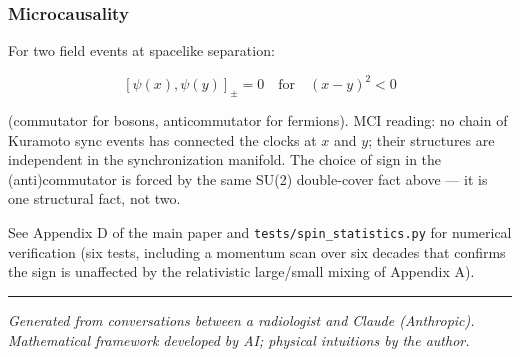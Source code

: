 \documentclass[
]{article}
\begin{document}
\subsubsection{Microcausality}\label{microcausality}

For two field events at spacelike separation:

\[\boxed{[\psi(x),\psi(y)]_\pm = 0 \quad \text{for}\quad (x-y)^2 < 0}\]

(commutator for bosons, anticommutator for fermions). MCI reading: no
chain of Kuramoto sync events has connected the clocks at \(x\) and
\(y\); their structures are independent in the synchronization manifold.
The choice of sign in the (anti)commutator is forced by the same SU(2)
double-cover fact above --- it is one structural fact, not two.

See Appendix D of the main paper and \texttt{tests/spin\_statistics.py}
for numerical verification (six tests, including a momentum scan over
six decades that confirms the sign is unaffected by the relativistic
large/small mixing of Appendix A).

\begin{center}\rule{0.5\linewidth}{0.5pt}\end{center}

\emph{Generated from conversations between a radiologist and Claude
(Anthropic). Mathematical framework developed by AI; physical intuitions
by the author.}
\end{document}
